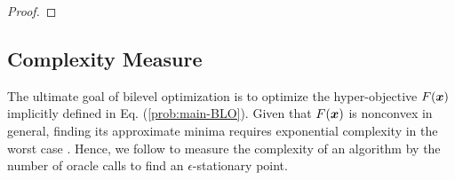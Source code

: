 \documentclass{article}
\begin{document}
\begin{proof}
        
\end{proof}



\subsection{Complexity Measure}
The ultimate goal of bilevel optimization is to optimize the hyper-objective $F({\bm{x}})$ implicitly defined in Eq. (\ref{prob:main-BLO}). Given that $F({\bm{x}})$ is nonconvex in general, finding its approximate minima requires exponential complexity in the worst case \citep{nemirovskij1983problem}. Hence, we follow \citep{carmon2020lower,carmon2021lower,arjevani2023lower} to measure the complexity of an algorithm by the number of oracle calls to find an $\epsilon$-stationary point.
\end{document}
